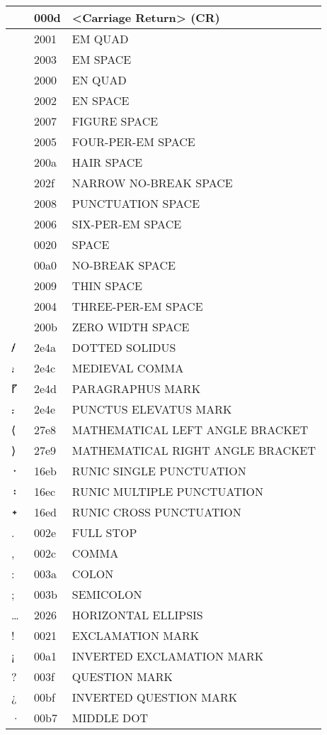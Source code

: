 \documentclass[12pt,letterpaper,openany]{book}
\begin{document}
\begin{center}
\begin{supertabular}{|m{0.25in}|m{0.5in}|m{4in}|}
 & 000d & <Carriage Return> (CR)\\\hline
  & 2001 & EM QUAD\\\hline
  & 2003 & EM SPACE\\\hline
  & 2000 & EN QUAD\\\hline
  & 2002 & EN SPACE\\\hline
  & 2007 & FIGURE SPACE\\\hline
  & 2005 & FOUR-PER-EM SPACE\\\hline
  & 200a & HAIR SPACE\\\hline
  & 202f & NARROW NO-BREAK SPACE\\\hline
  & 2008 & PUNCTUATION SPACE\\\hline
  & 2006 & SIX-PER-EM SPACE\\\hline
  & 0020 & SPACE\\\hline
  & 00a0 & NO-BREAK SPACE\\\hline
  & 2009 & THIN SPACE\\\hline
  & 2004 & THREE-PER-EM SPACE\\\hline
​ & 200b & ZERO WIDTH SPACE\\\hline
⹊ & 2e4a & DOTTED SOLIDUS\\\hline
⹌ & 2e4c & MEDIEVAL COMMA\\\hline
⹍ & 2e4d & PARAGRAPHUS MARK\\\hline
⹎ & 2e4e & PUNCTUS ELEVATUS MARK\\\hline
⟨ & 27e8 & MATHEMATICAL LEFT ANGLE BRACKET\\\hline
⟩ & 27e9 & MATHEMATICAL RIGHT ANGLE BRACKET\\\hline
᛫ & 16eb & RUNIC SINGLE PUNCTUATION\\\hline
᛬ & 16ec & RUNIC MULTIPLE PUNCTUATION\\\hline
᛭ & 16ed & RUNIC CROSS PUNCTUATION\\\hline
. & 002e & FULL STOP\\\hline
, & 002c & COMMA\\\hline
: & 003a & COLON\\\hline
; & 003b & SEMICOLON\\\hline
… & 2026 & HORIZONTAL ELLIPSIS\\\hline
! & 0021 & EXCLAMATION MARK\\\hline
¡ & 00a1 & INVERTED EXCLAMATION MARK\\\hline
? & 003f & QUESTION MARK\\\hline
¿ & 00bf & INVERTED QUESTION MARK\\\hline
· & 00b7 & MIDDLE DOT\\\hline

\end{supertabular}
\end{center}
\end{document}
